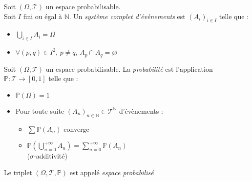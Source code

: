 \documentclass[11pt,a4paper,fleqn,pdftex]{report}
\begin{document}
\begin{dfn}
     Soit $(\Omega, \mathscr{T})$ un espace probabilisable.\\
     Soit $I$ fini ou égal à $\mathbb{N}$.\newline
     Un \emph{système complet d'évènements} est  $(A_i)_{i\in I}$ telle que :
     \begin{itemize}
         \item $\bigcup_{i\in I} A_i = \Omega$
         \item $\forall (p,q) \in I^2,\, p\neq q,\, A_p \cap A_q = \varnothing$
     \end{itemize}
\end{dfn}
\begin{dfn}[Probabilité]\label{dfn:probabilite}
     Soit $(\Omega, \mathscr{T})$ un espace probabilisable. La \emph{probabilité} est l'application $\mathbb{P} : \mathscr{T} \to [0,1]$ telle que :
     \begin{itemize}
         \item $\mathbb{P}(\Omega) = 1$
         \item Pour toute suite $(A_n)_{n\in\mathbb{N}} \in \mathscr{T}^\mathbb{N}$ d'évènements  : 
         \begin{itemize}
             \item $\sum \mathbb{P}(A_n)$ converge
             \item $\mathbb{P}\left( \bigcup_{n=0}^{+\infty} A_n \right) = \sum_{n=0}^{+\infty} \mathbb{P}(A_n)$\\
             ($\sigma$-additivité)
         \end{itemize}
     \end{itemize}
     Le triplet $(\Omega, \mathscr{T},\mathbb{P})$ est appelé \emph{espace probabilisé}
\end{dfn}
\\[\baselineskip]
\end{document}

